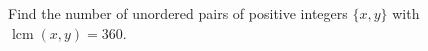 Find the number of unordered pairs of positive integers $\{x,y\}$ with $\operatorname{lcm}(x,y)=360$.

